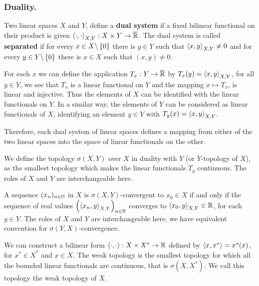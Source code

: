 \subsubsection{Duality.}
Two linear spaces $X$ and $Y$, define a \textbf{dual system} if a fixed bilinear functional on their product is given $\left\langle \cdot, \cdot \right\rangle_{X,Y}: X\times Y \rightarrow \overline{\mathbb{R}}$. The dual system is called \textbf{separated} if for every $x\in X\backslash\left\lbrace 0 \right\rbrace$ there is $y\in Y$ such that $\left\langle x,y \right\rangle_{X,Y}\neq 0$ and for every $y\in Y\backslash\left\lbrace 0 \right\rbrace$ there is $x\in X$ such that $(x,y)\neq 0$.

For each $x$ we can define the application $T_x:Y\rightarrow \overline{\mathbb{R}}$ by $T_x(y)=\left\langle x,y \right\rangle_{X,Y}$, for all $y\in Y$, we see that $T_x$ is a linear functional on $Y$ and the mapping $x\mapsto T_x$, is linear and injective. Thus the elements of $X$ can be identified with the linear functionals on $Y$. In a similar way, the elements of $Y$ can be considered as linear functionals of $X$, identifying an element $y\in Y$ with $T_y(x)=\left\langle x,y \right\rangle_{X,Y}$.
 
Therefore, each dual system of linear spaces defines a mapping from either of the two linear spaces into the space of linear functionals on the other.

We define the topology $\sigma(X,Y)$ over $X$ in duality with $Y$ (or $Y$-topology of $X$), as the smallest topology which makes the linear functionals $T_y$ continuous. The roles of $X$ and $Y$ are interchangeable here. 

A sequence $(x_n)_{n\in \mathbb{N}}$ in $X$ is $\sigma(X, Y)$-convergent to $x_0\in X$ if and only if the sequence of real values $\left( \left\langle x_n, y \right\rangle_{X,Y} \right)_{n\in \mathbb{N}}$ converges to $\left\langle x_0, y \right\rangle_{X,Y}\in\mathbb{R}$, for each $y\in Y$. The roles of $X$ and $Y$ are interchangeable here, we have equivalent convention for $\sigma(Y,X)$-convergence.



We can construct a bilinear form $\left\langle \cdot, \cdot \right\rangle:X\times X^*\rightarrow \mathbb{R}$ defined by $\left\langle x,x^* \right\rangle=x^*(x)$, for $x^*\in X^*$ and $x \in X$. The weak topology is the smallest topology for which all the bounded linear functionals are continuous, that is $\sigma(X, X^*)$. We call this topology the weak topology of $X$.  

